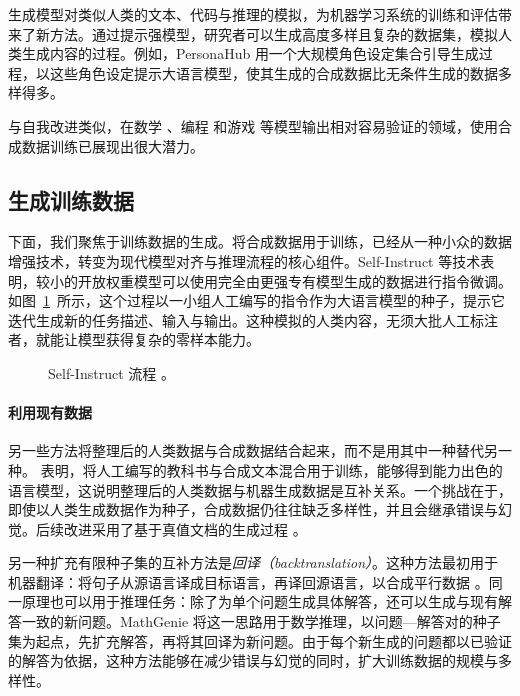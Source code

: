 生成模型对类似人类的文本、代码与推理的模拟，为机器学习系统的训练和评估带来了新方法。通过提示强模型，研究者可以生成高度多样且复杂的数据集，模拟人类生成内容的过程。例如，PersonaHub \citep{ge2025scalingsyntheticdatacreation} 用一个大规模角色设定集合引导生成过程，以这些角色设定提示大语言模型，使其生成的合成数据比无条件生成的数据多样得多。

与自我改进类似，在数学 \citep{NEURIPS2023_44414694, liu2023tinygsmachieving80gsm8k}、编程 \citep{haluptzok2023language} 和游戏 \citep{wang2023voyager} 等模型输出相对容易验证的领域，使用合成数据训练已展现出很大潜力。


\subsection{生成训练数据}
下面，我们聚焦于训练数据的生成。将合成数据用于训练，已经从一种小众的数据增强技术，转变为现代模型对齐与推理流程的核心组件。Self-Instruct \citep{wang-etal-2023-self-instruct} 等技术表明，较小的开放权重模型可以使用完全由更强专有模型生成的数据进行指令微调。如图~\ref{fig:self-instruct}~所示，这个过程以一小组人工编写的指令作为大语言模型的种子，提示它迭代生成新的任务描述、输入与输出。这种模拟的人类内容，无须大批人工标注者，就能让模型获得复杂的零样本能力。

\begin{figure}[tb]
    \centering
    
    \caption{Self-Instruct 流程 \citep{wang-etal-2023-self-instruct}。}
    \label{fig:self-instruct}
\end{figure}

\paragraph{利用现有数据}
另一些方法将整理后的人类数据与合成数据结合起来，而不是用其中一种替代另一种。\citet{gunasekar2023textbooksneed} 表明，将人工编写的教科书与合成文本混合用于训练，能够得到能力出色的语言模型，这说明整理后的人类数据与机器生成数据是互补关系。一个挑战在于，即使以人类生成数据作为种子，合成数据仍往往缺乏多样性，并且会继承错误与幻觉。后续改进采用了基于真值文档的生成过程 \citep{lupidi2025sourcesynth, NEURIPS2024_a4ca07aa}。


另一种扩充有限种子集的互补方法是{\em 回译（backtranslation）}。这种方法最初用于机器翻译：将句子从源语言译成目标语言，再译回源语言，以合成平行数据 \citep{edunov-etal-2018-understanding}。同一原理也可以用于推理任务：除了为单个问题生成具体解答，还可以生成与现有解答一致的新问题。MathGenie \citep{lu-etal-2024-mathgenie} 将这一思路用于数学推理，以问题—解答对的种子集为起点，先扩充解答，再将其回译为新问题。由于每个新生成的问题都以已验证的解答为依据，这种方法能够在减少错误与幻觉的同时，扩大训练数据的规模与多样性。

